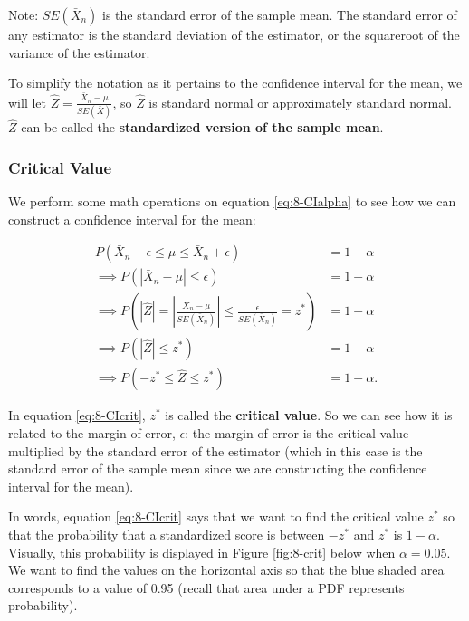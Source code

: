 \documentclass[
]{book}
\theoremstyle{definition}
\theoremstyle{definition}
\theoremstyle{definition}
\theoremstyle{definition}
\theoremstyle{remark}
\begin{document}
Note: \(SE(\bar{X}_n)\) is the standard error of the sample mean. The standard error of any estimator is the standard deviation of the estimator, or the squareroot of the variance of the estimator.

To simplify the notation as it pertains to the confidence interval for the mean, we will let \(\hat{Z} = \frac{\bar{X}_n - \mu}{SE(\bar{X})}\), so \(\hat{Z}\) is standard normal or approximately standard normal. \(\hat{Z}\) can be called the \textbf{standardized version of the sample mean}.

\hypertarget{critical-value}{%
\subsubsection{Critical Value}\label{critical-value}}

We perform some math operations on equation \eqref{eq:8-CIalpha} to see how we can construct a confidence interval for the mean:

\begin{equation} 
\begin{split}
P(\bar{X}_n - \epsilon \leq \mu \leq \bar{X}_n + \epsilon) &= 1 - \alpha \\
\implies P(|\bar{X}_n - \mu| \leq \epsilon) &= 1 - \alpha \\
\implies P \left(|\hat{Z}| = |\frac{\bar{X}_n - \mu}{SE(\bar{X}_n)}|  \leq \frac{\epsilon}{SE(\bar{X}_n)} = z^{*} \right) &= 1 - \alpha \\
\implies P(|\hat{Z}| \leq z^{*}) &= 1 - \alpha \\
\implies P(-z^{*} \leq \hat{Z} \leq z^{*}) &= 1 - \alpha.
\end{split}
\label{eq:8-CIcrit}
\end{equation}

In equation \eqref{eq:8-CIcrit}, \(z^*\) is called the \textbf{critical value}. So we can see how it is related to the margin of error, \(\epsilon\): the margin of error is the critical value multiplied by the standard error of the estimator (which in this case is the standard error of the sample mean since we are constructing the confidence interval for the mean).

In words, equation \eqref{eq:8-CIcrit} says that we want to find the critical value \(z^*\) so that the probability that a standardized score is between \(-z^*\) and \(z^*\) is \(1 - \alpha\). Visually, this probability is displayed in Figure \ref{fig:8-crit} below when \(\alpha=0.05\). We want to find the values on the horizontal axis so that the blue shaded area corresponds to a value of 0.95 (recall that area under a PDF represents probability).
\end{document}
